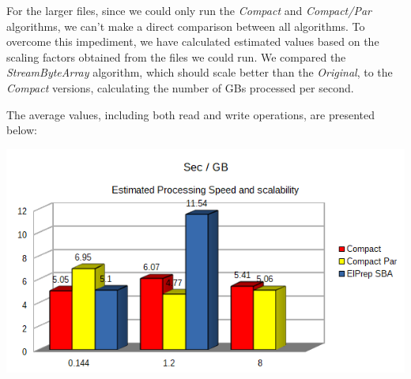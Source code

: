 \documentclass[a4paper,twoside]{article}
\begin{document}

For the larger files, since we could only run the {\it Compact} and {\it Compact/Par} algorithms, we can't make a direct comparison between all algorithms. To overcome this impediment, we have calculated estimated values based on the scaling factors obtained from the files we could run. 
We compared the {\it StreamByteArray} algorithm, which should scale better than the {\it Original}, to the {\it Compact} versions, calculating the number of GBs processed per second.

The average values, including both read and write operations, are presented below:

\begin{center}
	\includegraphics[scale=0.5]{images/seconds_per_gb_ryzen.png}
\end{center}
\end{document}
